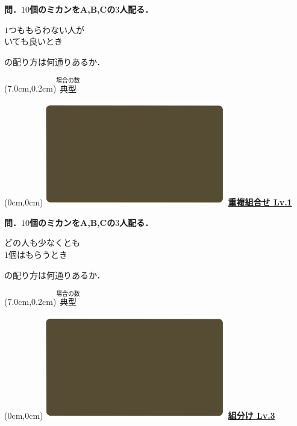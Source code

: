 \documentclass[10pt,
fleqn,
dvipdfmx,
uplatex
]{jsarticle}
\begin{document}
\normalsize
\bf\boldmath 問．${10}$個のミカンをA,\;B,\;Cの$3$人配る．

\huge
\vspace{-0.1zw}
\hspace{0.1zw} $1$つももらわない人が\\
\hfill いても良いとき\hspace{0.1zw} 

\normalsize
\vspace{0.0zw}
\hfill の配り方は何通りあるか．

\at(7.0cm,0.2cm){\small\color{bradorange}$\overset{\text{場合の数}}{\text{典型}}$}

\newpage

\at(0cm,0cm){\includegraphics[width=8cm,bb=0 0 1920 1080]{./youtube/thumbnails/templates/smart_background/場合の数.jpeg}}
{\color{orange}\bf\boldmath\LARGE\underline{重複組合せ Lv.1 }}\vspace{0.3zw}

\normalsize
\bf\boldmath 問．${10}$個のミカンをA,\;B,\;Cの$3$人配る．

\huge
\vspace{-0.1zw}
\hspace{0.1zw} どの人も少なくとも\\
\hfill$1$個はもらうとき\hspace{0.1zw} 

\normalsize
\vspace{0.1zw}
\hfill の配り方は何通りあるか．

\at(7.0cm,0.2cm){\small\color{bradorange}$\overset{\text{場合の数}}{\text{典型}}$}

\newpage

\at(0cm,0cm){\includegraphics[width=8cm,bb=0 0 1920 1080]{./youtube/thumbnails/templates/smart_background/場合の数.jpeg}}
{\color{orange}\bf\boldmath\huge\underline{組分け Lv.3 }}\vspace{0.3zw}
\end{document}
